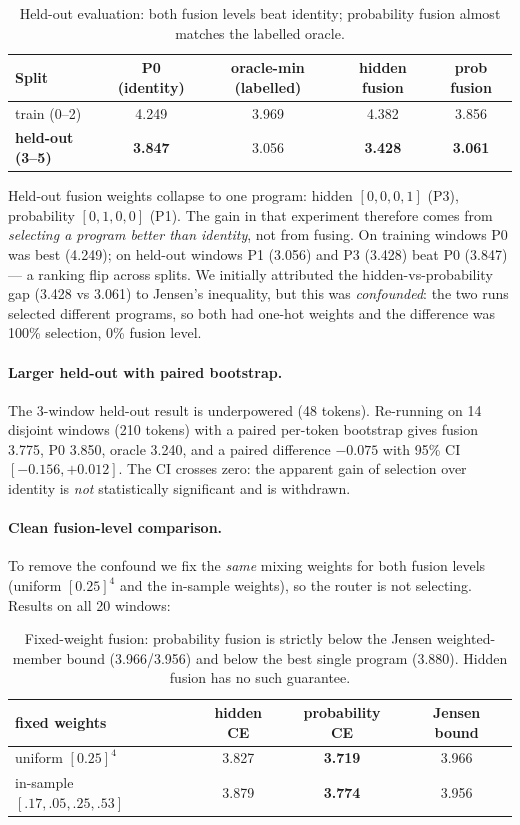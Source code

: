 \documentclass[11pt,a4paper]{article}
\begin{document}
\begin{table}[h]
\centering
\begin{tabular}{lcccc}
\toprule
Split & P0 (identity) & oracle-min (labelled) & hidden fusion & prob fusion \\
\midrule
train (0--2) & 4.249 & 3.969 & 4.382 & 3.856 \\
\textbf{held-out (3--5)} & \textbf{3.847} & 3.056 & \textbf{3.428} & \textbf{3.061} \\
\bottomrule
\end{tabular}
\caption{Held-out evaluation: both fusion levels beat identity; probability fusion
almost matches the labelled oracle.}
\end{table}

Held-out fusion weights collapse to one program: hidden $[0,0,0,1]$ (P3),
probability $[0,1,0,0]$ (P1). The gain in that experiment therefore comes from
\emph{selecting a program better than identity}, not from fusing. On training
windows P0 was best (4.249); on held-out windows P1 (3.056) and P3 (3.428) beat
P0 (3.847) --- a ranking flip across splits. We initially attributed the
hidden-vs-probability gap (3.428 vs 3.061) to Jensen's inequality, but this was
\emph{confounded}: the two runs selected different programs, so both had one-hot
weights and the difference was 100\% selection, 0\% fusion level.

\paragraph{Larger held-out with paired bootstrap.} The 3-window held-out result is
underpowered (48 tokens). Re-running on 14 disjoint windows (210 tokens) with a
paired per-token bootstrap gives fusion 3.775, P0 3.850, oracle 3.240, and a
paired difference $-0.075$ with 95\% CI $[-0.156,+0.012]$. The CI crosses zero:
the apparent gain of selection over identity is \emph{not} statistically
significant and is withdrawn.

\paragraph{Clean fusion-level comparison.} To remove the confound we fix the
\emph{same} mixing weights for both fusion levels (uniform $[0.25]^4$ and the
in-sample weights), so the router is not selecting. Results on all 20 windows:

\begin{table}[h]
\centering
\begin{tabular}{lccc}
\toprule
fixed weights & hidden CE & probability CE & Jensen bound \\
\midrule
uniform $[0.25]^4$ & 3.827 & \textbf{3.719} & 3.966 \\
in-sample $[.17,.05,.25,.53]$ & 3.879 & \textbf{3.774} & 3.956 \\
\bottomrule
\end{tabular}
\caption{Fixed-weight fusion: probability fusion is strictly below the Jensen
weighted-member bound (3.966/3.956) and below the best single program (3.880).
Hidden fusion has no such guarantee.}
\end{table}
\end{document}
